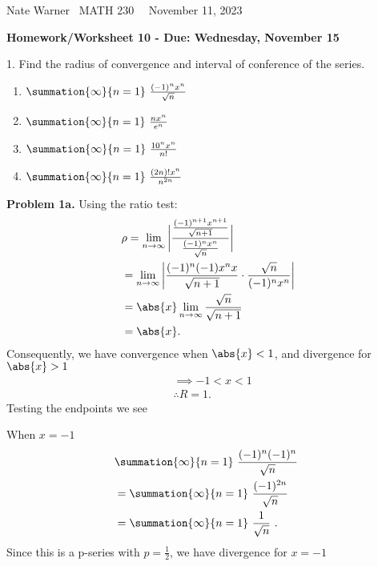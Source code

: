 \documentclass{report}
\title{\Huge{}}
\author{\huge{Nathan Warner}}
\date{\huge{}}
\begin{document}
    \pagebreak \bigbreak \noindent
    Nate Warner \ \quad \quad \quad \quad \quad \quad \quad \quad \quad \quad \quad \quad \quad \quad \quad \quad \quad  MATH 230 \quad  \quad \quad \quad \quad \quad \quad \quad \quad \ \ \quad \quad November 11, 2023
    \begin{center}
        \textbf{Homework/Worksheet 10 - Due: Wednesday, November 15}
    \end{center}
    \bigbreak \noindent 
    \begin{mdframed}
        1. Find the radius of convergence and interval of conference of the series.
        \begin{enumerate}[label=(\alph*)]
            \item $\summation{\infty}{n=1}\ \frac{(-1)^{n}x^{n}}{\sqrt{n}}\  $
            \item $\summation{\infty}{n=1}\ \frac{nx^{n}}{e^{n}}\  $
            \item $\summation{\infty}{n=1}\ \frac{10^{n}x^{n}}{n!}\  $
            \item $\summation{\infty}{n=1}\ \frac{(2n)!x^{n}}{n^{2n}}\  $
        \end{enumerate}
    \end{mdframed}
    \bigbreak \noindent 
    \textbf{Problem 1a.} Using the ratio test:
    \begin{align*}
        &\rho = \lim\limits_{n \to \infty}{\bigg\lvert \frac{\frac{(-1)^{n+1}x^{n+1}}{\sqrt{n+1}}}{\frac{(-1)^{n}x^{n}}{\sqrt{n}}} \bigg\rvert}  \\
        &=\lim\limits_{n \to \infty}{\bigg\lvert \frac{(-1)^{n}(-1)x^{n}x}{\sqrt{n+1}} \cdot  \frac{\sqrt{n}}{(-1)^{n}x^{n}} \bigg\rvert} \\
        &=\abs{x} \lim\limits_{n \to \infty}{\frac{\sqrt{n}}{\sqrt{n+1}}}  \\
        &=\abs{x} 
    .\end{align*}
    \bigbreak \noindent 
    Consequently, we have convergence when $\abs{x} < 1$, and divergence for $\abs{x} > 1$
    \begin{align*}
        &\implies  -1 < x < 1 \\
        &\therefore R = 1 
    .\end{align*}
    \bigbreak \noindent 
    Testing the endpoints we see
    \bigbreak \noindent 
    \begin{minipage}[t]{0.4\textwidth}
        When $x=-1$
        \begin{align*}
            &\summation{\infty}{n=1}\ \frac{(-1)^{n}(-1)^{n}}{\sqrt{n}}\  \\
            &=\summation{\infty}{n=1}\ \frac{(-1)^{2n}}{\sqrt{n}}\  \\
            &=\summation{\infty}{n=1}\ \frac{1}{\sqrt{n}}\ 
        .\end{align*}
        Since this is a p-series with $p=\frac{1}{2} $, we have divergence for $x=-1$
    \end{minipage}
\end{document}
